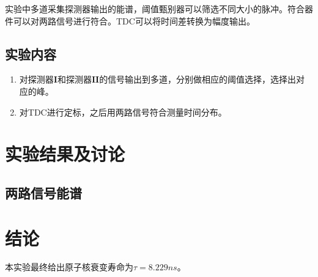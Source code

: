 \documentclass[12pt]{ctexart}
\begin{document}
实验中多道采集探测器输出的能谱，阈值甄别器可以筛选不同大小的脉冲。符合器件可以对两路信号进行符合。TDC可以将时间差转换为幅度输出。
\subsection{实验内容}
\begin{enumerate}
    \item 对探测器$\mathbf{I}$和探测器$\mathbf{II}$的信号输出到多道，分别做相应的阈值选择，选择出对应的峰。
    \item 对TDC进行定标，之后用两路信号符合测量时间分布。
\end{enumerate}
\section{实验结果及讨论}
\subsection{两路信号能谱}

\section{结论}
本实验最终给出原子核衰变寿命为$\tau=8.229ns$。

\end{document}
